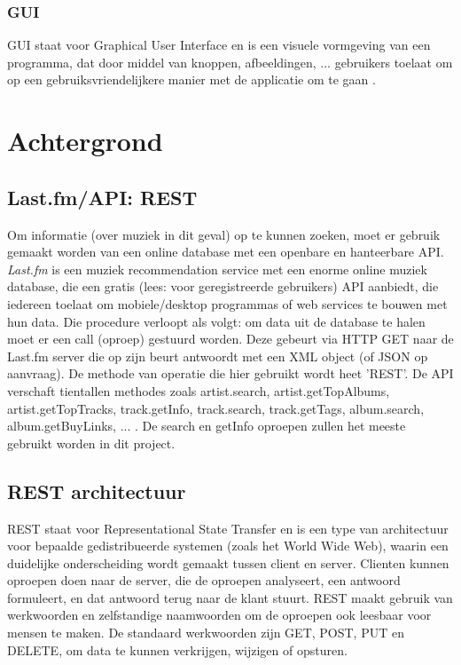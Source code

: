 \documentclass[11pt,a4paper]{article}
\begin{document}
		\subsubsection{GUI}
		GUI staat voor Graphical User Interface en is een visuele vormgeving van een programma, dat door middel van knoppen, afbeeldingen, ... gebruikers toelaat om op een gebruiksvriendelijkere manier met de applicatie om te gaan .

\section{Achtergrond}
	\subsection{Last.fm/API: REST}
Om informatie (over muziek in dit geval) op te kunnen zoeken, moet er gebruik gemaakt worden van een online database met een openbare en hanteerbare API. \textit{Last.fm} is een muziek recommendation service met een enorme online muziek database, die  een gratis (lees: voor geregistreerde gebruikers) API aanbiedt, die iedereen toelaat om mobiele/desktop programmas of web services te bouwen met hun data.
\newline
Die procedure verloopt als volgt: om data uit de database te halen moet er een call (oproep) gestuurd worden. Deze gebeurt via HTTP GET naar de Last.fm server die op zijn beurt antwoordt met een XML object (of JSON op aanvraag). De methode van operatie die hier gebruikt wordt heet 'REST'. 
\newline
De API verschaft tientallen methodes zoals artist.search, artist.getTopAlbums, artist.getTopTracks, track.getInfo, track.search, track.getTags, album.search, album.getBuyLinks, ... . De search en getInfo oproepen zullen het meeste gebruikt worden in dit project. 
	\subsection{REST architectuur}
	REST staat voor Representational State Transfer en is een type van architectuur voor bepaalde gedistribueerde systemen (zoals het World Wide Web), waarin een duidelijke onderscheiding wordt gemaakt tussen client en server. Clienten kunnen oproepen doen naar de server, die de oproepen analyseert, een antwoord formuleert, en dat antwoord terug naar de klant stuurt. REST maakt gebruik van werkwoorden en zelfstandige naamwoorden om de oproepen ook leesbaar voor mensen te maken. De standaard werkwoorden zijn GET, POST, PUT en DELETE, om data te kunnen verkrijgen, wijzigen of opsturen.
	
\end{document}
